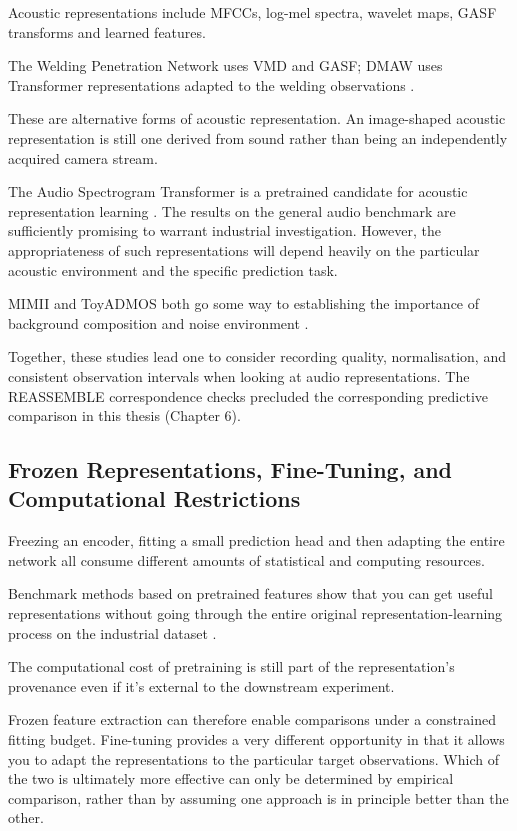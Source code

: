 Acoustic representations include MFCCs, log-mel spectra, wavelet maps, GASF transforms and learned
features.

The Welding Penetration Network uses VMD and GASF; DMAW uses Transformer representations adapted to
the welding observations \citep{Hua2026Weld,P003}.

These are alternative forms of acoustic representation. An image-shaped acoustic representation is
still one derived from sound rather than being an independently acquired camera stream.

The Audio Spectrogram Transformer is a pretrained candidate for acoustic representation learning
\citep{P011}. The results on the general audio benchmark are sufficiently promising to warrant
industrial investigation. However, the appropriateness of such representations will depend heavily
on the particular acoustic environment and the specific prediction task.

MIMII and ToyADMOS both go some way to establishing the importance of background composition and
noise environment \citep{Purohit2019MIMII,Koizumi2019ToyADMOS}.

Together, these studies lead one to consider recording quality, normalisation, and consistent
observation intervals when looking at audio representations. The REASSEMBLE correspondence checks
precluded the corresponding predictive comparison in this thesis (Chapter 6).

\subsection{Frozen Representations, Fine-Tuning, and Computational Restrictions}

Freezing an encoder, fitting a small prediction head and then adapting the entire network all
consume different amounts of statistical and computing resources.

Benchmark methods based on pretrained features show that you can get useful representations without
going through the entire original representation-learning process on the industrial dataset
\citep{Roth2022Towards,Costanzino2024Multimodal}.

The computational cost of pretraining is still part of the representation's provenance even if it's
external to the downstream experiment.

Frozen feature extraction can therefore enable comparisons under a constrained fitting budget.
Fine-tuning provides a very different opportunity in that it allows you to adapt the representations
to the particular target observations. Which of the two is ultimately more effective can only be
determined by empirical comparison, rather than by assuming one approach is in principle better than
the other.

